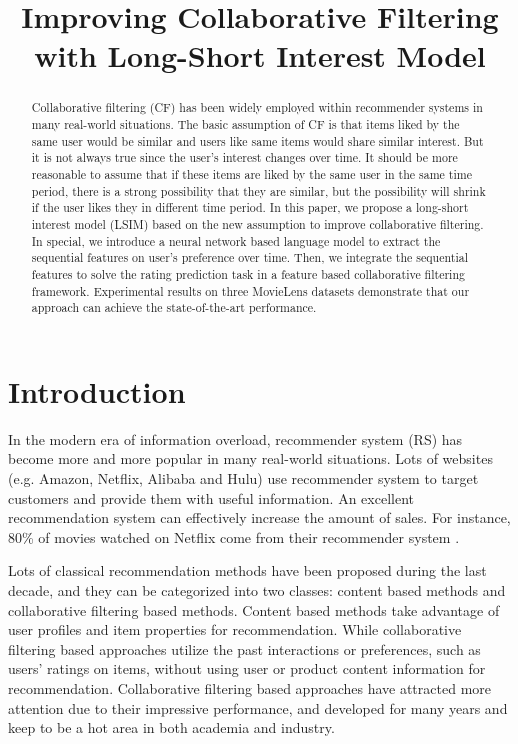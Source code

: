 \documentclass{llncs}
\begin{document}
%
\title{Improving Collaborative Filtering with Long-Short Interest Model}
%
\maketitle
%
\begin{abstract}
Collaborative filtering (CF) has been widely employed within
recommender systems in many real-world situations.
The basic assumption of CF is that items liked by the same user would be similar and
users like same items would share similar interest.
But it is not always true since the user's interest changes over time.
It should be more reasonable to assume that
if these items are liked by the same user in the same time period,
there is a strong possibility that they are similar,
but the possibility will shrink if the user likes they in different time period.
In this paper, we propose a long-short interest model (LSIM) based on
the new assumption to improve collaborative filtering.
In special, we introduce a neural network based language model
to extract the sequential features on user's preference over time.
Then, we integrate the sequential features to solve the rating prediction task
in a feature based collaborative filtering framework.
Experimental results on three MovieLens datasets demonstrate that
our approach can achieve the state-of-the-art performance.
\end{abstract}
%
\section{Introduction}
In the modern era of information overload,
recommender system (RS) has become more and more popular in many real-world situations.
Lots of websites (e.g. Amazon, Netflix, Alibaba and Hulu) use recommender system to
target customers and provide them with useful information.
An excellent recommendation system can effectively increase the amount of sales.
For instance, 80\% of movies watched on Netflix
come from their recommender system \cite{gomez2015netflix}.

Lots of classical recommendation methods have been proposed
during the last decade, and they can be categorized into two classes:
content based methods and collaborative filtering based methods.
Content based methods \cite{pazzani2007content} take advantage of
user profiles and item properties for recommendation.
While collaborative filtering based approaches \cite{su2009survey} utilize
the past interactions or preferences, such as users' ratings on items,
without using user or product content information for recommendation.
Collaborative filtering based approaches have attracted more attention
due to their impressive performance, and developed for many years and
keep to be a hot area in both academia and industry.
\end{document}
